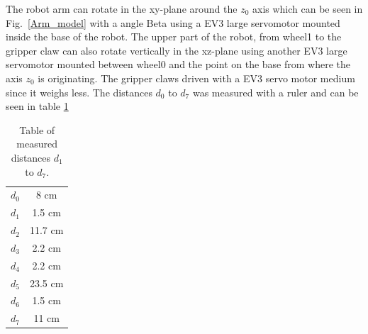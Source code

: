 The robot arm can rotate in the xy-plane around the \(z_0\) axis which can be seen in Fig.~\ref{Arm_model} with a angle Beta using a EV3 large servomotor mounted inside the base of the robot. The upper part of the robot, from wheel1 to the gripper claw can also rotate vertically in the xz-plane using another EV3 large servomotor mounted between wheel0 and the point on the base from where the axis \(z_0\) is originating. The gripper claws  driven with a EV3 servo motor medium since it weighs less. The distances \(d_0\) to \(d_7\) was measured with a ruler and can be seen in table \ref{Tab:distance_table}
\begin{table}[h]
\begin{center}
\begin{tabular}{ |c|c| }
 \hline
 \(d_0\) & 8 cm  \\
 \(d_1\) & 1.5 cm  \\
 \(d_2\) & 11.7 cm  \\
 \(d_3\) & 2.2 cm\\
 \(d_4\) & 2.2 cm\\
 \(d_5\) & 23.5 cm\\
 \(d_6\) & 1.5 cm\\
 \(d_7\) & 11 cm \\
 \hline
\end{tabular}
\end{center}
\caption{Table of measured distances \(d_1\) to \(d_7\).}
\label{Tab:distance_table}
\end{table}
